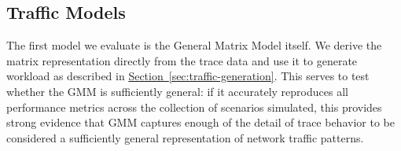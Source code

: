 \documentclass[twocolumn,final]{svjour3}
\newcommand{\caps}[1]{{\small{#1}}}
\newcommand{\Section}[1]{\hyperref[sec:#1]{Section~\ref*{sec:#1}}}
\begin{document}



\subsection{Traffic Models}
\label{sec:traffic-models}

The first model we evaluate is the General Matrix Model itself. We derive the matrix representation directly from the trace data and use it to generate workload as described in \Section{traffic-generation}. This serves to test whether the \caps{GMM} is sufficiently general: if it accurately reproduces all performance metrics across the collection of scenarios simulated, this provides strong evidence that \caps{GMM} captures enough of the detail of trace behavior to be considered a sufficiently general representation of network traffic patterns. %
\end{document}
